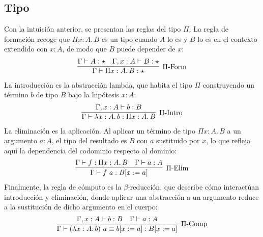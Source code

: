 \subsection{Tipo \Pi}
\indent Con la intuición anterior, se presentan las reglas del tipo $\Pi$. La regla de formación recoge que $\Pi x : A.\, B$ es un tipo cuando $A$ lo es y $B$ lo es en el contexto extendido con $x : A$, de modo que $B$ puede depender de $x$:
\begin{gather}
  \infer[\text{$\Pi$-Form}]
  {\Gamma \vdash \Pi x : A.\, B : \star}
  {\Gamma \vdash A : \star & \Gamma, x : A \vdash B : \star}
\end{gather}
La introducción es la abstracción lambda, que habita el tipo $\Pi$ construyendo un término $b$ de tipo $B$ bajo la hipótesis $x : A$:
\begin{gather}
  \infer[\text{$\Pi$-Intro}]
  {\Gamma \vdash \lambda x : A.\, b : \Pi x : A.\, B}
  {\Gamma, x : A \vdash b : B}
\end{gather}
La eliminación es la aplicación. Al aplicar un término de tipo $\Pi x : A.\, B$ a un argumento $a : A$, el tipo del resultado es $B$ con $a$ sustituido por $x$, lo que refleja aquí la dependencia del codominio respecto al dominio:
\begin{gather}
  \infer[\text{$\Pi$-Elim}]
  {\Gamma \vdash f\ a : B[x := a]}
  {\Gamma \vdash f : \Pi x : A.\, B & \Gamma \vdash a : A}
\end{gather}
Finalmente, la regla de cómputo es la $\beta$-reducción, que describe cómo interactúan introducción y eliminación, donde aplicar una abstracción a un argumento reduce a la sustitución de dicho argumento en el cuerpo:
\begin{gather}
  \infer[\text{$\Pi$-Comp}]
  {\Gamma \vdash (\lambda x : A.\, b)\ a \equiv b[x := a] : B[x := a]}
  {\Gamma, x : A \vdash b : B & \Gamma \vdash a : A}
\end{gather}

